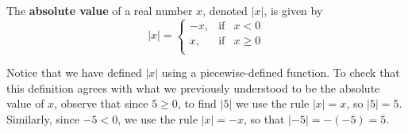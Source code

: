 \medskip

\bbm

\begin{defn}

\label{absolutevalue}

The \textbf{absolute value} of a real number $x$, denoted $|x|$, is given by \[ |x| = \left\{ \begin{array}{rcl} -x, & \mbox{if} & x < 0  \\ x, & \mbox{if} & x \geq 0 \\ \end{array} \right.\]

\end{defn}

\ebm%

\medskip

Notice that we have defined $|x|$ using a piecewise-defined function.  To check that this definition agrees with what we previously understood to be the absolute value of $x$, observe that since $5 \geq 0$, to find $|5|$ we use the rule $|x| = x$, so $|5|=5$.  Similarly, since $-5 < 0$, we use the rule $|x| = -x$, so that $|-5| = -(-5) = 5$.\pp


